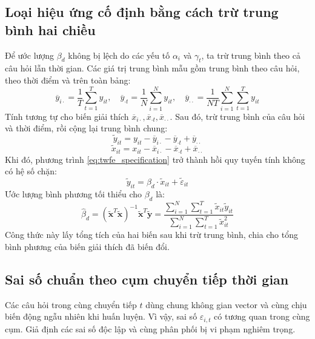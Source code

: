 \subsection{Loại hiệu ứng cố định bằng cách trừ trung bình hai chiều}
Để ước lượng $\beta_d$ không bị lệch do các yếu tố $\alpha_i$ và $\gamma_t$, ta trừ trung bình theo cả câu hỏi lẫn thời gian.
Các giá trị trung bình mẫu gồm trung bình theo câu hỏi, theo thời điểm và trên toàn bảng:
\begin{equation}
\overline{y}_{i\cdot} = \frac{1}{T} \sum_{t=1}^T y_{it}, \quad \overline{y}_{\cdot t} = \frac{1}{N} \sum_{i=1}^N y_{it}, \quad \overline{y}_{\cdot\cdot} = \frac{1}{NT} \sum_{i=1}^N \sum_{t=1}^T y_{it}
\end{equation}
Tính tương tự cho biến giải thích $\overline{x}_{i\cdot}, \overline{x}_{\cdot t}, \overline{x}_{\cdot\cdot}$. Sau đó, trừ trung bình của câu hỏi và thời điểm, rồi cộng lại trung bình chung:
\begin{equation}
\widetilde{y}_{it} = y_{it} - \overline{y}_{i\cdot} - \overline{y}_{\cdot t} + \overline{y}_{\cdot\cdot}
\end{equation}
\begin{equation}
\widetilde{x}_{it} = x_{it} - \overline{x}_{i\cdot} - \overline{x}_{\cdot t} + \overline{x}_{\cdot\cdot}
\end{equation}
Khi đó, phương trình \eqref{eq:twfe_specification} trở thành hồi quy tuyến tính không có hệ số chặn:
\begin{equation}
\widetilde{y}_{it} = \beta_d \cdot \widetilde{x}_{it} + \widetilde{\varepsilon}_{it}
\end{equation}
Ước lượng bình phương tối thiểu cho $\beta_d$ là:
\begin{equation}
\widehat{\beta}_d = \left( \widetilde{\mathbf{x}}^T \widetilde{\mathbf{x}} \right)^{-1} \widetilde{\mathbf{x}}^T \widetilde{\mathbf{y}} = \frac{\sum_{i=1}^N \sum_{t=1}^T \widetilde{x}_{it} \widetilde{y}_{it}}{\sum_{i=1}^N \sum_{t=1}^T \widetilde{x}_{it}^2}
\label{eq:ols_demeaned}
\end{equation}
Công thức này lấy tổng tích của hai biến sau khi trừ trung bình, chia cho tổng bình phương của biến giải thích đã biến đổi.
\subsection{Sai số chuẩn theo cụm chuyển tiếp thời gian}
Các câu hỏi trong cùng chuyển tiếp $t$ dùng chung không gian vector và cùng chịu biến động ngẫu nhiên khi huấn luyện. Vì vậy, sai số $\varepsilon_{i,t}$ có tương quan trong cùng cụm. Giả định các sai số độc lập và cùng phân phối bị vi phạm nghiêm trọng.

